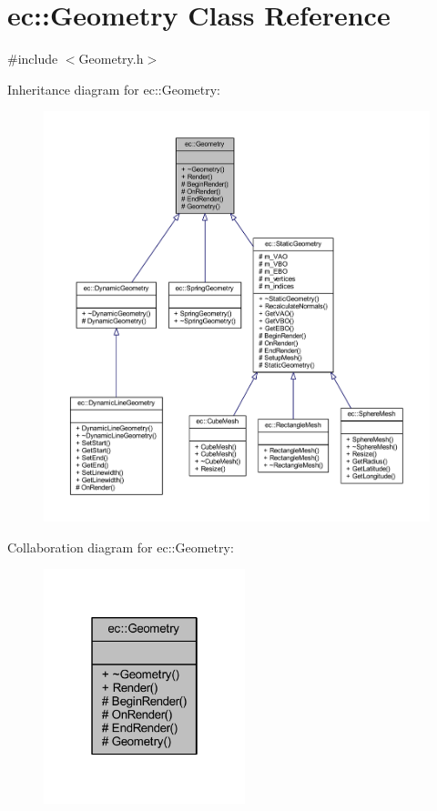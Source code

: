 \hypertarget{classec_1_1_geometry}{}\section{ec\+:\+:Geometry Class Reference}
\label{classec_1_1_geometry}


{\ttfamily \#include $<$Geometry.\+h$>$}



Inheritance diagram for ec\+:\+:Geometry\+:
\nopagebreak
\begin{figure}[H]
\begin{center}
\leavevmode
\includegraphics[width=350pt]{classec_1_1_geometry__inherit__graph}
\end{center}
\end{figure}


Collaboration diagram for ec\+:\+:Geometry\+:
\nopagebreak
\begin{figure}[H]
\begin{center}
\leavevmode
\includegraphics[width=166pt]{classec_1_1_geometry__coll__graph}
\end{center}
\end{figure}
